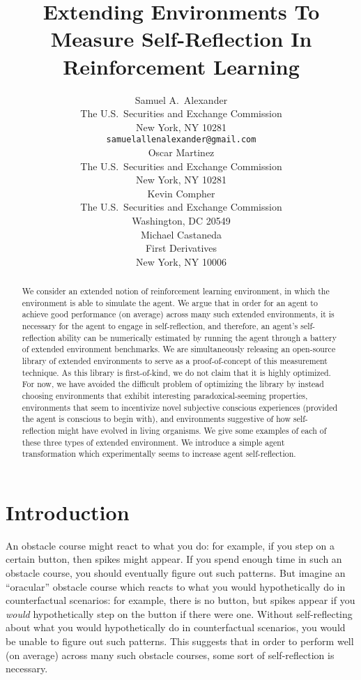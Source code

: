 \documentclass{article}
\title{Extending Environments To Measure Self-Reflection In Reinforcement Learning}
\author{
  Samuel A.~Alexander\\
  The U.S.\ Securities and Exchange Commission\\
  New York, NY 10281\\
  \texttt{samuelallenalexander@gmail.com}\\
  \And
  Oscar Martinez\\
  The U.S.\ Securities and Exchange Commission\\
  New York, NY 10281\\
  \And
  Kevin Compher\\
  The U.S.\ Securities and Exchange Commission\\
  Washington, DC 20549\\
  \And
  Michael Castaneda\\
  First Derivatives\\
  New York, NY 10006\\
}
\begin{document}
\maketitle

\begin{abstract}
  We consider an extended notion
  of reinforcement learning environment, in which the environment is able
  to simulate the agent. We argue that in order for an agent to achieve
  good performance (on average) across many such extended environments,
  it is necessary for the agent to engage in self-reflection, and therefore,
  an agent's self-reflection ability can be numerically estimated by running
  the agent through a battery of extended environment benchmarks.
  We are simultaneously releasing an open-source library of extended
  environments to serve as a proof-of-concept of this measurement technique.
  As this library is first-of-kind, we do not claim that it is highly
  optimized. For now, we have avoided the difficult problem of optimizing
  the library by instead choosing environments that exhibit interesting
  paradoxical-seeming properties, environments that seem to incentivize
  novel subjective conscious experiences (provided the agent is conscious
  to begin with), and environments suggestive of how self-reflection might
  have evolved in living organisms. We give some examples of each of these
  three types of extended environment. We introduce a simple agent
  transformation which experimentally seems to increase agent self-reflection.
\end{abstract}

\section{Introduction}

An obstacle course might react to what you do: for example, if you step on a certain
button, then spikes might appear. If you spend enough time in such an obstacle course,
you should eventually figure out such patterns.
But imagine an ``oracular'' obstacle course which reacts to
what you would hypothetically do in counterfactual scenarios: for example, there is
no button, but spikes appear
if you \emph{would} hypothetically step on the button if there were one. Without
self-reflecting about what you would hypothetically do in counterfactual scenarios, you
would be unable to figure out such patterns. This suggests that in order to perform
well (on average) across many such obstacle courses, some sort of self-reflection is
necessary.
\end{document}
